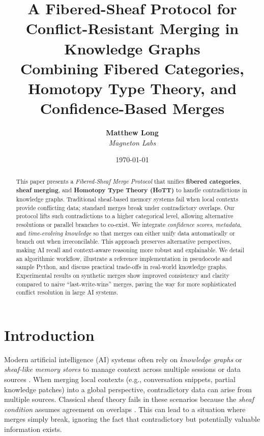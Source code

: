 \documentclass{article}
\title{%
A Fibered-Sheaf Protocol for Conflict-Resistant Merging in Knowledge Graphs \\
\large Combining Fibered Categories, Homotopy Type Theory, and Confidence-Based Merges
}
\author{
  \textbf{Matthew Long}\\
  \textit{Magneton Labs}
}
\date{\today}
\begin{document}
\maketitle

\begin{abstract}
This paper presents a \emph{Fibered-Sheaf Merge Protocol} that unifies \textbf{fibered categories}, \textbf{sheaf merging}, and \textbf{Homotopy Type Theory (HoTT)} to handle contradictions in knowledge graphs. Traditional sheaf-based memory systems fail when local contexts provide conflicting data; standard merges break under contradictory overlaps. Our protocol lifts such contradictions to a higher categorical level, allowing alternative resolutions or parallel branches to co-exist. We integrate \emph{confidence scores}, \emph{metadata}, and \emph{time-evolving knowledge} so that merges can either unify data automatically or branch out when irreconcilable. This approach preserves alternative perspectives, making AI recall and context-aware reasoning more robust and explainable. We detail an algorithmic workflow, illustrate a reference implementation in pseudocode and sample Python, and discuss practical trade-offs in real-world knowledge graphs. Experimental results on synthetic merges show improved consistency and clarity compared to naive ``last-write-wins'' merges, paving the way for more sophisticated conflict resolution in large AI systems.
\end{abstract}

\tableofcontents

\section{Introduction}
\label{sec:intro}

Modern artificial intelligence (AI) systems often rely on \emph{knowledge graphs} or \emph{sheaf-like memory stores} to manage context across multiple sessions or data sources \citep{toposMemory2025, knowledgeGraphs2018}. When merging local contexts (e.g., conversation snippets, partial knowledge patches) into a global perspective, contradictory data can arise from multiple sources. Classical sheaf theory fails in these scenarios because the \emph{sheaf condition} assumes agreement on overlaps \citep{maclane1971categories}. This can lead to a situation where merges simply break, ignoring the fact that contradictory but potentially valuable information exists.
\end{document}
